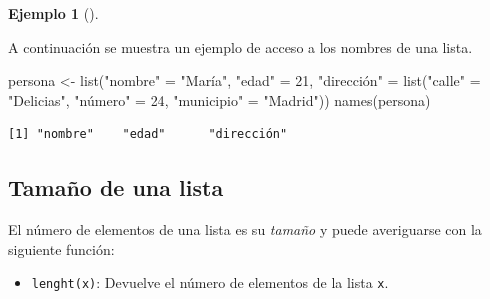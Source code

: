 \documentclass[
  a4paper,
]{scrreport}
\newenvironment{Shaded}{\begin{snugshade}}{\end{snugshade}}
\newcommand{\DecValTok}[1]{\textcolor[rgb]{0.68,0.00,0.00}{#1}}
\newcommand{\FunctionTok}[1]{\textcolor[rgb]{0.28,0.35,0.67}{#1}}
\newcommand{\NormalTok}[1]{\textcolor[rgb]{0.00,0.23,0.31}{#1}}
\newcommand{\OtherTok}[1]{\textcolor[rgb]{0.00,0.23,0.31}{#1}}
\newcommand{\StringTok}[1]{\textcolor[rgb]{0.13,0.47,0.30}{#1}}
\providecommand{\tightlist}{%
  \setlength{\itemsep}{0pt}\setlength{\parskip}{0pt}}\usepackage{longtable,booktabs,array}
\theoremstyle{definition}
\theoremstyle{definition}
\newtheorem{example}{Ejemplo}[chapter]
\theoremstyle{remark}
\begin{document}
\leavevmode{}%
\begin{example}[]\label{exm-acceso-listas}

A continuación se muestra un ejemplo de acceso a los nombres de una
lista.

\begin{Shaded}
\begin{Highlighting}[]
\NormalTok{persona }\OtherTok{\textless{}{-}} \FunctionTok{list}\NormalTok{(}\StringTok{"nombre"} \OtherTok{=} \StringTok{"María"}\NormalTok{, }\StringTok{"edad"} \OtherTok{=} \DecValTok{21}\NormalTok{, }\StringTok{"dirección"} \OtherTok{=} \FunctionTok{list}\NormalTok{(}\StringTok{"calle"} \OtherTok{=} \StringTok{"Delicias"}\NormalTok{, }\StringTok{"número"} \OtherTok{=} \DecValTok{24}\NormalTok{, }\StringTok{"municipio"} \OtherTok{=} \StringTok{"Madrid"}\NormalTok{))}
\FunctionTok{names}\NormalTok{(persona)}
\end{Highlighting}
\end{Shaded}

\begin{verbatim}
[1] "nombre"    "edad"      "dirección"
\end{verbatim}

\end{example}

\hypertarget{tamauxf1o-de-una-lista}{%
\subsection{Tamaño de una lista}\label{tamauxf1o-de-una-lista}}

El número de elementos de una lista es su \emph{tamaño} y puede
averiguarse con la siguiente función:

\begin{itemize}
\tightlist
\item
  \texttt{lenght(x)}: Devuelve el número de elementos de la lista
  \texttt{x}.
\end{itemize}
\end{document}
